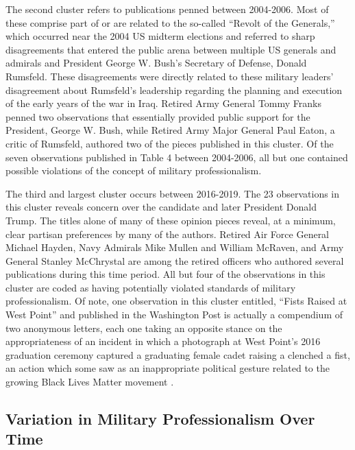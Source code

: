 \documentclass[12pt,]{article}
\begin{document}
The second cluster refers to publications penned between 2004-2006. Most of these comprise part of or are related to the so-called ``Revolt of the Generals,'' which occurred near the 2004 US midterm elections and referred to sharp disagreements that entered the public arena between multiple US generals and admirals and President George W. Bush's Secretary of Defense, Donald Rumsfeld. These disagreements were directly related to these military leaders' disagreement about Rumsfeld's leadership regarding the planning and execution of the early years of the war in Iraq. Retired Army General Tommy Franks penned two observations that essentially provided public support for the President, George W. Bush, while Retired Army Major General Paul Eaton, a critic of Rumsfeld, authored two of the pieces published in this cluster. Of the seven observations published in Table 4 between 2004-2006, all but one contained possible violations of the concept of military professionalism.

The third and largest cluster occurs between 2016-2019. The 23 observations in this cluster reveals concern over the candidate and later President Donald Trump. The titles alone of many of these opinion pieces reveal, at a minimum, clear partisan preferences by many of the authors. Retired Air Force General Michael Hayden, Navy Admirals Mike Mullen and William McRaven, and Army General Stanley McChrystal are among the retired officers who authored several publications during this time period. All but four of the observations in this cluster are coded as having potentially violated standards of military professionalism. Of note, one observation in this cluster entitled, ``Fists Raised at West Point'' and published in the Washington Post is actually a compendium of two anonymous letters, each one taking an opposite stance on the appropriateness of an incident in which a photograph at West Point's 2016 graduation ceremony captured a graduating female cadet raising a clenched a fist, an action which some saw as an inappropriate political gesture related to the growing Black Lives Matter movement \autocite{unknown_fists_2016}.

\hypertarget{variation-in-military-professionalism-over-time}{%
\subsection{Variation in Military Professionalism Over Time}\label{variation-in-military-professionalism-over-time}}
\end{document}
